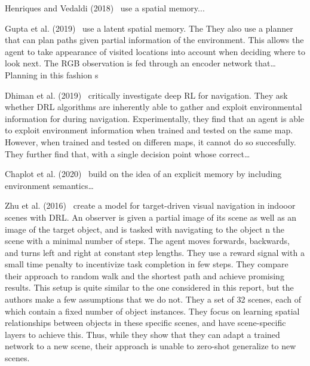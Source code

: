 Henriques and Vedaldi (2018)~\cite{henriques_vedaldi_2018} use a spatial memory...

Gupta et al. (2019)~\cite{gupta_cognitive_2019} use a latent spatial memory.
The 
They also use a planner that can plan paths given partial information of the environment.
This allows the agent to take appearance of visited locations into account when deciding where to look next.
The RGB observation is fed through an encoder network that\dots
Planning in this fashion s

Dhiman et al. (2019)~\cite{dhiman_critical_2019} critically investigate deep RL for navigation.
They ask whether DRL algorithms are inherently able to gather and exploit environmental information for during navigation.
Experimentally, they find that an agent is able to exploit environment information when trained and tested on the same map.
However, when trained and tested on differen maps, it cannot do so succesfully.
They further find that, with a single decision point whose correct\dots

Chaplot et al. (2020)~\cite{chaplot_semantic_2020} build on the idea of an explicit memory by including environment semantics\dots

Zhu et al. (2016)~\cite{zhu_target_driven_2016} create a model for target-driven visual navigation in indooor scenes with DRL.
An observer is given a partial image of its scene as well as an image of the target object, and is tasked with navigating to the object n the scene with a minimal number of steps.
The agent moves forwards, backwards, and turns left and right at constant step lengths.
They use a reward signal with a small time penalty to incentivize task completion in few steps.
They compare their approach to random walk and the shortest path and achieve promising results.
This setup is quite similar to the one considered in this report, but the authors make a few assumptions that we do not.
They a set of 32 scenes, each of which contain a fixed number of object instances.
They focus on learning spatial relationships between objects in these specific scenes, and have scene-specific layers to achieve this.
Thus, while they show that they can adapt a trained network to a new scene, their approach is unable to zero-shot generalize to new scenes.

